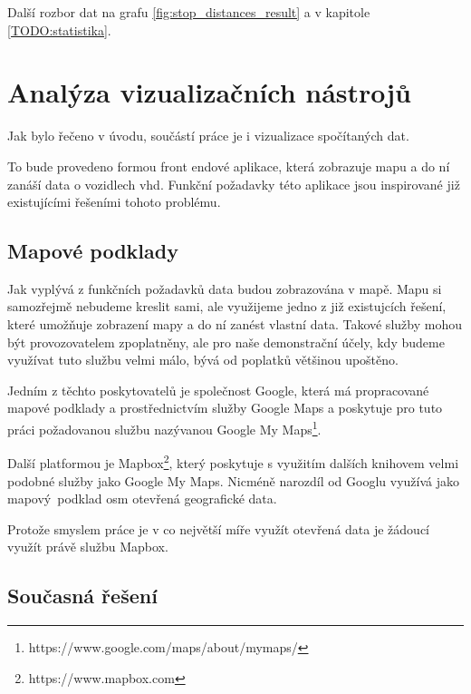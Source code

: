 \bigbreak

Další rozbor dat na grafu \ref{fig:stop_distances_result} a v kapitole \ref{TODO:statistika}.




\section{Analýza vizualizačních nástrojů}

Jak bylo řečeno v úvodu, součástí práce je i vizualizace spočítaných dat.

\bigbreak

To bude provedeno formou front endové aplikace, která zobrazuje mapu a do ní zanáší data o vozidlech \gls{vhd}. Funkční požadavky této aplikace jsou inspirované již existujícími řešeními tohoto problému.

\subsection{Mapové podklady}

Jak vyplývá z funkčních požadavků data budou zobrazována v mapě. Mapu si samozřejmě nebudeme kreslit sami, ale využijeme jedno z již existujcích řešení, které umožňuje zobrazení mapy a do ní zanést vlastní data. Takové služby mohou být provozovatelem zpoplatněny, ale pro naše demonstrační účely, kdy budeme využívat tuto službu velmi málo, bývá od poplatků většinou upoštěno.

\bigbreak

Jedním z těchto poskytovatelů je společnost Google, která má propracované mapové podklady a prostřednictvím služby Google Maps a poskytuje pro tuto práci požadovanou službu nazývanou Google My Maps\footnote{https://www.google.com/maps/about/mymaps/}.

\bigbreak

Další platformou je Mapbox\footnote{https://www.mapbox.com}, který poskytuje s využitím dalších knihovem velmi podobné služby jako Google My Maps. Nicméně narozdíl od Googlu využívá jako mapový podklad \gls{osm} {otevřená geografické data}.

\bigbreak

Protože smyslem práce je v co největší míře využít otevřená data je žádoucí využít právě službu Mapbox.

\subsection{Současná řešení} \label{subsection:soucasna_reseni_front_end}

